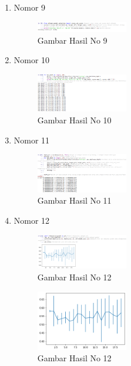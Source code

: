 \begin{enumerate}
\item Nomor 9
	\hfill\break
	
	
\begin{figure}[H]
	\includegraphics[width=4cm]{figures/1174062/2/ScikitLearn/Nomor 9.png}
	\centering
	\caption{Gambar Hasil No 9 }
\end{figure}
	
\item Nomor 10
	\hfill\break
	
	
\begin{figure}[H]
	\includegraphics[width=4cm]{figures/1174062/2/ScikitLearn/Nomor 10.png}
	\centering
	\caption{Gambar Hasil No 10 }
\end{figure}

\item Nomor 11
	\hfill\break
	
	
\begin{figure}[H]
	\includegraphics[width=4cm]{figures/1174062/2/ScikitLearn/Nomor 11.png}
	\centering
	\caption{Gambar Hasil No 11 }
\end{figure}	

\item Nomor 12
	\hfill\break
	
	
\begin{figure}[H]
	\includegraphics[width=4cm]{figures/1174062/2/ScikitLearn/Nomor 12.png}
	\centering
	\caption{Gambar Hasil No 12 }
\end{figure}
	
\begin{figure}[H]
	\includegraphics[width=4cm]{figures/1174062/2/ScikitLearn/12.png}
	\centering
	\caption{Gambar Hasil No 12 }
\end{figure}
	
\end{enumerate}

